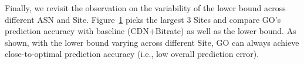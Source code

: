 Finally, we revisit the observation on the variability of the lower bound across different ASN and Site. Figure~\ref{fig:compare-partition} picks the largest 3 Sites and compare GO's prediction accuracy with baseline (CDN+Bitrate) as well as the lower bound. As shown, with the lower bound varying across different Site, GO can always achieve close-to-optimal prediction accuracy (i.e., low overall prediction error).

\begin{figure}[h!]
\centering
{}
\hspace{-0.6cm}
\tightcaption{}
\label{fig:compare-partition}
\end{figure}

